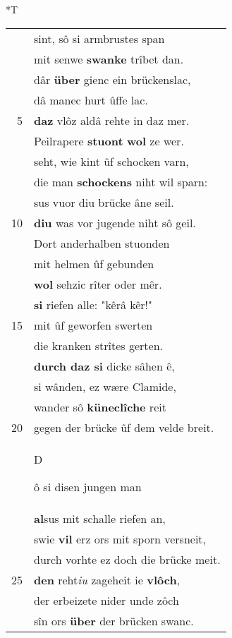 \documentclass[8pt,a4paper,notitlepage]{article}
\begin{document}
\begin{table}[ht]
\begin{minipage}[t]{0.5\linewidth}
\end{minipage}
\hspace{0.5cm}
\begin{minipage}[t]{0.5\linewidth}
\small
\begin{center}*T
\end{center}
\begin{tabular}{rl}
 & sint, sô si armbrustes span\\ 
 & mit senwe \textbf{swanke} trîbet dan.\\ 
 & dâr \textbf{über} gienc ein brückenslac,\\ 
 & dâ manec hurt ûffe lac.\\ 
5 & \textbf{daz} vlôz aldâ rehte in daz mer.\\ 
 & Peilrapere \textbf{stuont} \textbf{wol} ze wer.\\ 
 & seht, wie kint ûf schocken varn,\\ 
 & die man \textbf{schockens} niht wil sparn:\\ 
 & sus vuor diu brücke âne seil.\\ 
10 & \textbf{diu} was vor jugende niht sô geil.\\ 
 & Dort anderhalben stuonden\\ 
 & mit helmen ûf gebunden\\ 
 & \textbf{wol} sehzic rîter oder mêr.\\ 
 & \textbf{si} riefen alle: "kêrâ kêr!"\\ 
15 & mit ûf geworfen swerten\\ 
 & die kranken strîtes gerten.\\ 
 & \textbf{durch daz si} dicke sâhen ê,\\ 
 & si wânden, ez wære Clamide,\\ 
 & wander sô \textbf{küneclîche} reit\\ 
20 & gegen der brücke ûf dem velde breit.\\ 
 & \begin{large}D\end{large}ô si disen jungen man\\ 
 & \textbf{al}sus mit schalle riefen an,\\ 
 & swie \textbf{vil} erz ors mit sporn versneit,\\ 
 & durch vorhte ez doch die brücke meit.\\ 
25 & \textbf{den} reht\textit{iu} zageheit ie \textbf{vlôch},\\ 
 & der erbeizete nider unde zôch\\ 
 & sîn ors \textbf{über} der brücken swanc.\\ 

\end{tabular}
\end{minipage}
\end{table}
\end{document}
